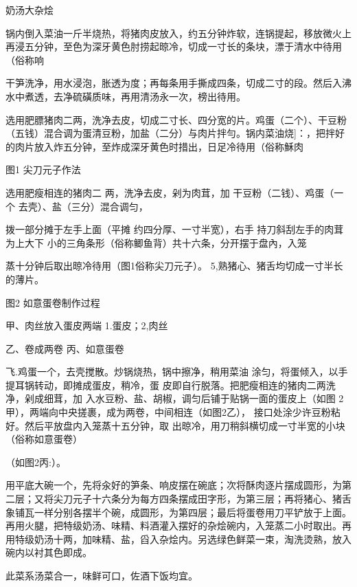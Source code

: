 \begin{recipe}{奶汤大杂烩}

\ingredients



\cooking

\step 锅内倒入菜油一斤半烧热，将猪肉皮放入，约五分钟炸软，连锅提起，移放微火上再浸五分钟，至色为深牙黄色肘捞起晾冷，切成一寸长的条块，漂于清水中待用（俗称响

\step 

\step 干笋洗净，用水浸泡，胀透为度；再每条用手撕成四条，切成二寸的段。然后入沸水中煮透，去净硫磺质味，再用清汤永一次，榜出待用。

\step 选用肥膘猪肉二两，洗净去皮，切成二寸长、四分宽的片。鸡蛋（二个）、干豆粉（五钱）混合调为蛋清豆粉，加盐（二分）与肉片拌勻。锅内菜油烧]：，把拌好的肉片放入炸五分钟，至炸成深牙黄色时措出，日足冷待用（俗称穌肉

图1 尖刀元子作法

选用肥瘦相连的猪肉二 两，洗净去皮，剁为肉茸，加 干豆粉（二钱）、鸡蛋（一个 去壳）、盐（三分）混合调匀，

拨一部分摊于左手上面（平摊 约四分厚、一寸半宽），右手 持刀斜刮左手的肉茸为上大下 小的三角条形（俗称鲫鱼背）共十六条，分开摆于盘內，入笼

蒸十分钟后取出晾冷待用（图1俗称尖刀元子）。 5,熟猪心、猪舌均切成一寸半长的薄片。

图2 如意蛋卷制作过程

甲、肉丝放入蛋皮两端 1.蛋皮；2,肉丝

乙、卷成两卷 丙、如意蛋卷

飞.鸡蛋一个，去壳搅散。炒锅烧热，锅中擦净，稍用菜油 涂匀，将蛋倾入，以手提耳锅转动，即摊成蛋皮，稍冷，蛋 皮即自行脱落。把肥瘦相连的猪肉二两洗净，剁成细茸，加 入水豆粉、盐、胡椒，调匀后铺于贴锅一面的蛋皮上（如图 2甲），两端向中央搓裹，成为两卷，中间相连（如图2乙）， 接口处涂少许豆粉粘好。然后平放盘内入笼蒸十五分钟，取 出晾冷，用刀稍斜横切成一寸半宽的小块（俗称如意蛋卷）

（如图2丙:）。

\step 用平底大碗一个，先将汆好的笋条、响皮摆在碗底；次将酥肉逐片摆成圆形，为第二层；又将尖刀元子十六条分为每方四条摆成田字形，为第三层；再将猪心、猪舌象铺瓦一样分别各摆半个碗，成圆形，为第四层；最后将蛋卷用刀平铲放于上面。再用火腿，把特级奶汤、味精、料酒灌入摆好的杂烩碗内，入笼蒸二小时取出。再用特级奶汤十两，加味精、盐，舀入杂烩内。另选绿色鲜菜一束，淘洗烫熟，放入碗内以衬其色即成。

\notes

此菜系汤菜合一，味鲜可口，佐酒下饭均宜。

\end{recipe}

